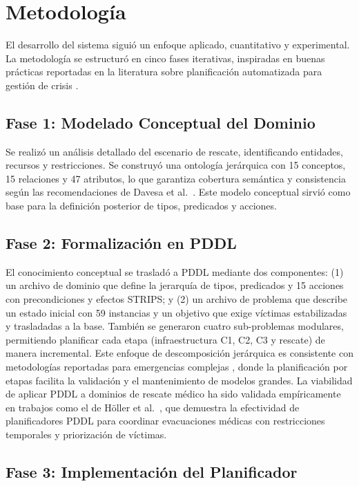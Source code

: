 \documentclass[conference]{IEEEtran}
\begin{document}
    \section{Metodología}

    El desarrollo del sistema siguió un enfoque aplicado, cuantitativo y experimental. La metodología se estructuró en cinco fases iterativas, inspiradas en buenas prácticas reportadas en la literatura sobre planificación automatizada para gestión de crisis \cite{bidoux2017,yang2022}.

    \subsection{Fase 1: Modelado Conceptual del Dominio}

    Se realizó un análisis detallado del escenario de rescate, identificando entidades, recursos y restricciones. Se construyó una ontología jerárquica con 15 conceptos, 15 relaciones y 47 atributos, lo que garantiza cobertura semántica y consistencia según las recomendaciones de Davesa et al.\ \cite{davesa2024}. Este modelo conceptual sirvió como base para la definición posterior de tipos, predicados y acciones.

    \subsection{Fase 2: Formalización en PDDL}

    El conocimiento conceptual se trasladó a PDDL mediante dos componentes: (1) un archivo de dominio que define la jerarquía de tipos, predicados y 15 acciones con precondiciones y efectos STRIPS; y (2) un archivo de problema que describe un estado inicial con 59 instancias y un objetivo que exige víctimas estabilizadas y trasladadas a la base. También se generaron cuatro sub-problemas modulares, permitiendo planificar cada etapa (infraestructura C1, C2, C3 y rescate) de manera incremental. Este enfoque de descomposición jerárquica es consistente con metodologías reportadas para emergencias complejas \cite{liu2016htn}, donde la planificación por etapas facilita la validación y el mantenimiento de modelos grandes. La viabilidad de aplicar PDDL a dominios de rescate médico ha sido validada empíricamente en trabajos como el de Höller et al.\ \cite{holler2014medevac}, que demuestra la efectividad de planificadores PDDL para coordinar evacuaciones médicas con restricciones temporales y priorización de víctimas.

    \subsection{Fase 3: Implementación del Planificador}
\end{document}
